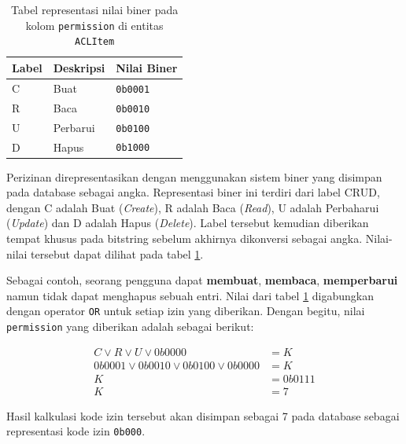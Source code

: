     \begin{table}[H]
        \centering
        \begin{tabular}{|l|l|l|}
        \hline
        Label & Deskripsi & Nilai Biner \\ \hline
        C     & Buat      & \texttt{0b0001}        \\ \hline
        R     & Baca      & \texttt{0b0010}        \\ \hline
        U     & Perbarui  & \texttt{0b0100}        \\ \hline
        D     & Hapus     & \texttt{0b1000}        \\ \hline
        \end{tabular}
        \caption{Tabel representasi nilai biner pada kolom \texttt{permission} di entitas \texttt{ACLItem}}
        \label{tab:aclitem_level}
    \end{table}
        
    
    Perizinan direpresentasikan dengan menggunakan sistem biner yang disimpan pada database sebagai angka.
    Representasi biner ini terdiri dari label CRUD, dengan C adalah Buat (\textit{Create}), R adalah
    Baca (\textit{Read}), U adalah Perbaharui (\textit{Update}) dan D adalah Hapus (\textit{Delete}).
    Label tersebut kemudian diberikan tempat khusus pada bitstring sebelum akhirnya dikonversi
    sebagai angka. Nilai-nilai tersebut dapat dilihat pada tabel \ref{tab:aclitem_level}.
    
    
    Sebagai contoh, seorang pengguna dapat \textbf{membuat}, \textbf{membaca}, \textbf{memperbarui}
    namun tidak dapat menghapus sebuah entri. Nilai dari tabel \ref{tab:aclitem_level} digabungkan
    dengan operator \texttt{OR} untuk setiap izin yang diberikan.
    Dengan begitu, nilai \texttt{permission} yang diberikan adalah sebagai berikut:
    
    \begin{subequations}
        \begin{align}
            C \vee R \vee U \vee 0b0000 &= K\\
            0b0001 \vee 0b0010 \vee 0b0100 \vee 0b0000 &= K \\
            K &= 0b0111 \\
            K &= 7
        \end{align}
    \end{subequations}
    
    Hasil kalkulasi kode izin tersebut akan disimpan sebagai 7 pada database sebagai representasi
    kode izin \texttt{0b000}. 
    
